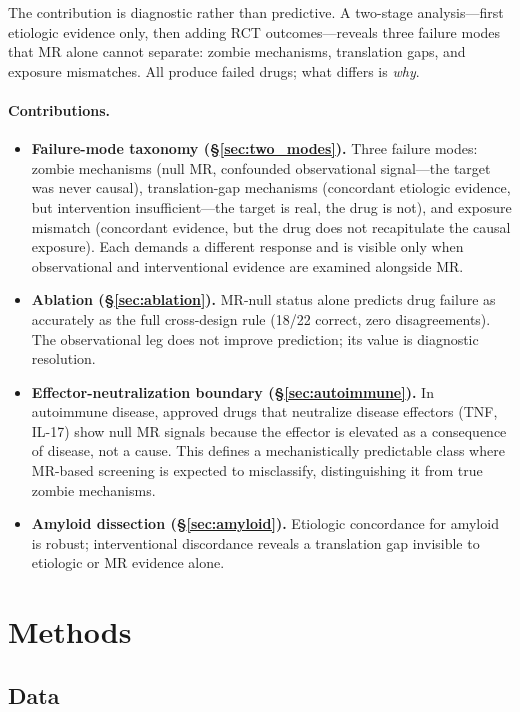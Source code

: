 \documentclass[11pt]{article}
\begin{document}
The contribution is diagnostic rather than predictive. A two-stage analysis---first etiologic evidence only, then adding RCT outcomes---reveals three failure modes that MR alone cannot separate: zombie mechanisms, translation gaps, and exposure mismatches. All produce failed drugs; what differs is \emph{why}.

\paragraph{Contributions.}
\begin{itemize}
\item \textbf{Failure-mode taxonomy (\S\ref{sec:two_modes}).} Three failure modes: zombie mechanisms (null MR, confounded observational signal---the target was never causal), translation-gap mechanisms (concordant etiologic evidence, but intervention insufficient---the target is real, the drug is not), and exposure mismatch (concordant evidence, but the drug does not recapitulate the causal exposure). Each demands a different response and is visible only when observational and interventional evidence are examined alongside MR.
\item \textbf{Ablation (\S\ref{sec:ablation}).} MR-null status alone predicts drug failure as accurately as the full cross-design rule (18/22 correct, zero disagreements). The observational leg does not improve prediction; its value is diagnostic resolution.
\item \textbf{Effector-neutralization boundary (\S\ref{sec:autoimmune}).} In autoimmune disease, approved drugs that neutralize disease effectors (TNF, IL-17) show null MR signals because the effector is elevated as a consequence of disease, not a cause. This defines a mechanistically predictable class where MR-based screening is expected to misclassify, distinguishing it from true zombie mechanisms.
\item \textbf{Amyloid dissection (\S\ref{sec:amyloid}).} Etiologic concordance for amyloid is robust; interventional discordance reveals a translation gap invisible to etiologic or MR evidence alone.
\end{itemize}

\section{Methods}

\subsection{Data}
\end{document}
